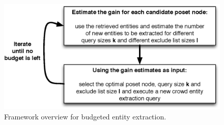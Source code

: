 \begin{figure}
	\begin{center}
	\includegraphics[clip,scale=0.43]{figs/framework.eps}
	\vspace{-10pt}
	\caption{Framework overview for budgeted entity extraction.}
	\label{fig:framework}
	\end{center}
	\vspace{-20pt}
\end{figure}
